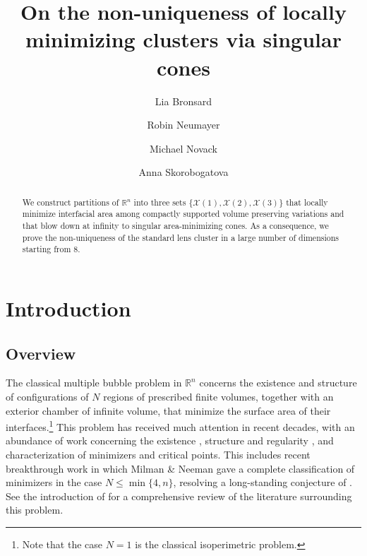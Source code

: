 \documentclass[10pt,reqno]{amsart}
\title[]{On the non-uniqueness of locally minimizing clusters via singular cones}
\author[L. Bronsard]{Lia Bronsard}
\author[R. Neumayer]{Robin Neumayer}
\author[M. Novack]{Michael Novack}
\author[A. Skorobogatova]{Anna Skorobogatova}
\numberwithin{equation}{section}
\theoremstyle{definition}
\newcommand{\R}{\mathbb{R}}
\newcommand{\X}{\mathcal{X}}
\begin{document}
\begin{abstract}
We construct partitions of $\mathbb{R}^n$ into three sets $\{\X(1),\X(2),\X(3)\}$ that locally minimize interfacial area among compactly supported volume preserving variations and that blow down at infinity to singular area-minimizing cones.
{As a consequence, we prove the} non-uniqueness of the standard lens cluster in a large number of dimensions starting from $8$. 
\end{abstract}

\maketitle



\section{Introduction}
\subsection{Overview}
The classical multiple bubble problem in $\R^n$ concerns the existence and structure of configurations of $N$ regions of  prescribed finite volumes, together with an exterior chamber of infinite volume, that minimize the surface area of their interfaces.\footnote{Note that the case $N=1$ is the classical isoperimetric problem.} This problem has received much attention in recent decades, with an abundance of work concerning the existence \cite{Alm76}, structure and regularity \cite{JTaylor76, ColEdeSpo22}, and characterization \cite{FoiAlfBroHodZim93, HutMorRitRos02,ReiHeiLaiSpi03,Rei08, Wichiramala,PaTo20, DRTi23,MilXu25, MilNee23} of minimizers and critical points. This includes recent breakthrough work in which  Milman \& Neeman \cites{MilNee22} gave a complete classification of minimizers in the case $N\leq \min\{4,n\}$, resolving a long-standing conjecture of \cite{SulMor96}. 
See the introduction of \cite{MilNee22} for a comprehensive review of the literature surrounding this problem.
\medskip
\end{document}
